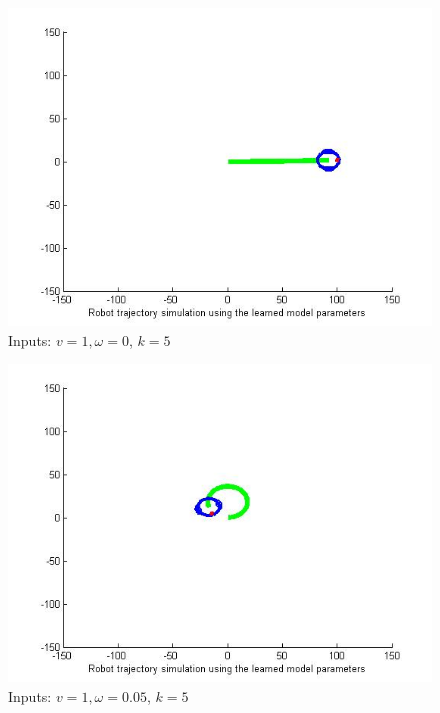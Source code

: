 \documentclass[10pt,a4paper]{report}
\begin{document}
\begin{figure}[!ht]
	\graphicspath{{./Exercise1/}}
	\centering
	\includegraphics[scale=0.5]{k_5_fig_3}	
	
	\begin{flushleft}
	\caption{Inputs: $v=1,\omega=0$, $k=5$}
	\end{flushleft}
	\label{fig:fig_8}
	
\end{figure}

\begin{figure}[!ht]
	\graphicspath{{./Exercise1/}}
	\centering
	\includegraphics[scale=0.5]{k_5_fig_4}	
	
	\begin{flushleft}
	\caption{Inputs: $v=1,\omega=0.05$, $k=5$}
	\end{flushleft}
	\label{fig:fig_9}
	
\end{figure}
\end{document}
